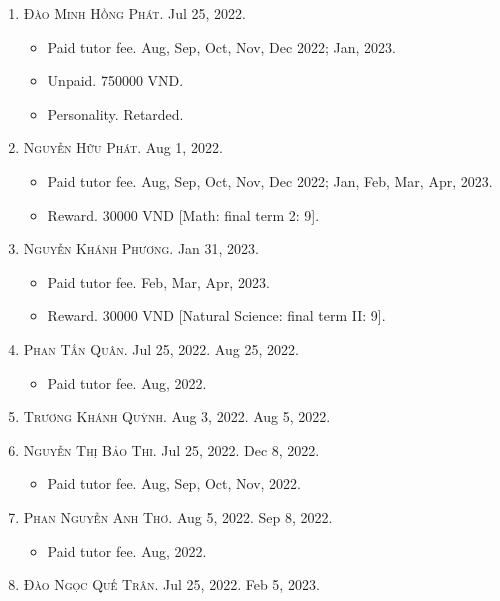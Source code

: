 \documentclass{article}
\begin{document}
\begin{enumerate}
\begin{itemize}
	\end{itemize}
	\item \textsc{Đào Minh Hồng Phát.} {\sf[In]} Jul 25, 2022. {\sf[Out]}
	\begin{itemize}
		\item {\sf Paid tutor fee.} Aug, Sep, Oct, Nov, Dec 2022; Jan, 2023.
		\item {\sf Unpaid.} 750000 VND.
		\item {\sf Personality.} Retarded.
	\end{itemize}
	\item \textsc{Nguyễn Hữu Phát.} {\sf[In]} Aug 1, 2022.
	\begin{itemize}
		\item {\sf Paid tutor fee.} Aug, Sep, Oct, Nov, Dec 2022; Jan, Feb, Mar, Apr, 2023.
		\item {\sf Reward.} 30000 VND [Math: final term 2: 9].
	\end{itemize}
	\item \textsc{Nguyễn Khánh Phương.}  {\sf[In]} Jan 31, 2023.
	\begin{itemize}
		\item {\sf Paid tutor fee.} Feb, Mar, Apr, 2023.
		\item {\sf Reward.} 30000 VND [Natural Science: final term II: 9].
	\end{itemize}
	\item \textsc{Phan Tấn Quân.} {\sf[In]} Jul 25, 2022. {\sf[Out]} Aug 25, 2022.
	\begin{itemize}
		\item {\sf Paid tutor fee.} Aug, 2022.
	\end{itemize}
	\item \textsc{Trương Khánh Quỳnh.} {\sf[In]} Aug 3, 2022. {\sf[Out]} Aug 5, 2022.
	\item \textsc{Nguyễn Thị Bảo Thi.} {\sf[In]} Jul 25, 2022. {\sf[Out]} Dec 8, 2022.
	\begin{itemize}
		\item {\sf Paid tutor fee.} Aug, Sep, Oct, Nov, 2022.
	\end{itemize}
	\item \textsc{Phan Nguyễn Anh Thơ.} {\sf[In]} Aug 5, 2022. {\sf[Out]} Sep 8, 2022.
	\begin{itemize}
		\item {\sf Paid tutor fee.} Aug, 2022.
	\end{itemize}
	\item \textsc{Đào Ngọc Quế Trân.} {\sf[In]} Jul 25, 2022. {\sf[Out]} Feb 5, 2023.
	\begin{itemize}

\end{itemize}
\end{enumerate}
\end{document}
